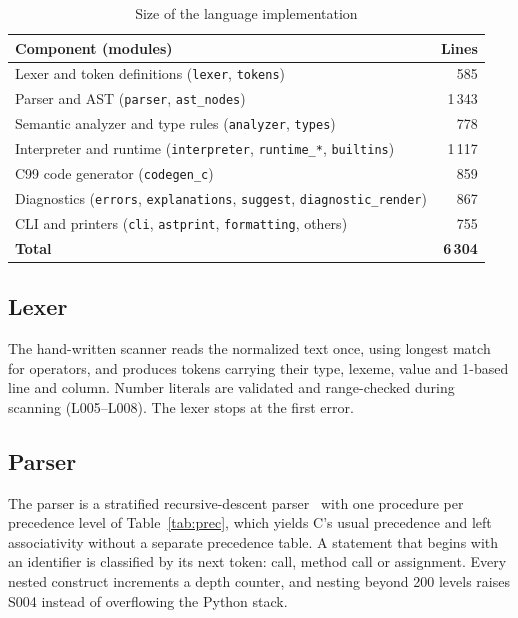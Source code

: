 \documentclass[conference]{IEEEtran}
\begin{document}
\begin{table}[t]
\caption{Size of the language implementation}
\label{tab:loc}
\centering
\footnotesize
\begin{tabular}{@{}L{6.4cm} r@{}}
\toprule
\textbf{Component (modules)} & \textbf{Lines} \\
\midrule
Lexer and token definitions (\texttt{lexer}, \texttt{tokens}) & 585 \\
Parser and AST (\texttt{parser}, \texttt{ast\_nodes}) & 1\,343 \\
Semantic analyzer and type rules (\texttt{analyzer}, \texttt{types}) & 778 \\
Interpreter and runtime (\texttt{interpreter}, \texttt{runtime\_*}, \texttt{builtins}) & 1\,117 \\
C99 code generator (\texttt{codegen\_c}) & 859 \\
Diagnostics (\texttt{errors}, \texttt{explanations}, \texttt{suggest}, \texttt{diagnostic\_render}) & 867 \\
CLI and printers (\texttt{cli}, \texttt{astprint}, \texttt{formatting}, others) & 755 \\
\midrule
\textbf{Total} & \textbf{6\,304} \\
\bottomrule
\end{tabular}
\end{table}

\subsection{Lexer}
The hand-written scanner reads the normalized text once, using longest match for operators, and produces
tokens carrying their type, lexeme, value and 1-based line and column. Number literals are validated and
range-checked during scanning (L005--L008). The lexer stops at the first error.

\subsection{Parser}
The parser is a stratified recursive-descent parser~\cite{dragonbook} with one procedure per precedence level
of Table~\ref{tab:prec}, which yields C's usual precedence and left associativity without a separate
precedence table. A statement that begins with an identifier is classified by its next token: call,
method call or assignment. Every nested construct increments a depth counter, and nesting beyond 200 levels
raises S004 instead of overflowing the Python stack.
\end{document}
